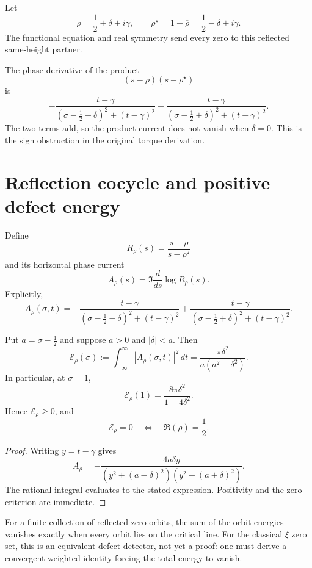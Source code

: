 Let
\[
  \rho=\frac12+\delta+i\gamma,
  \qquad
  \rho^\star=1-\overline\rho=\frac12-\delta+i\gamma.
\]
The functional equation and real symmetry send every zero to this reflected
same-height partner.

The phase derivative of the product
\[
  (s-\rho)(s-\rho^\star)
\]
is
\[
 -\frac{t-\gamma}{(\sigma-\frac12-\delta)^2+(t-\gamma)^2}
 -\frac{t-\gamma}{(\sigma-\frac12+\delta)^2+(t-\gamma)^2}.
\]
The two terms add, so the product current does not vanish when $\delta=0$.
This is the sign obstruction in the original torque derivation.

\section{Reflection cocycle and positive defect energy}

\begin{definition}
Define
\[
  R_\rho(s)=\frac{s-\rho}{s-\rho^\star}
\]
and its horizontal phase current
\[
  A_\rho(s)=\Im\frac{d}{ds}\log R_\rho(s).
\]
Explicitly,
\[
  A_\rho(\sigma,t)
  =-\frac{t-\gamma}{(\sigma-\frac12-\delta)^2+(t-\gamma)^2}
   +\frac{t-\gamma}{(\sigma-\frac12+\delta)^2+(t-\gamma)^2}.
\]
\end{definition}

\begin{theorem}
Put $a=\sigma-\tfrac12$ and suppose $a>0$ and $|\delta|<a$.  Then
\[
  \mathcal E_\rho(\sigma)
  :=\int_{-\infty}^{\infty}|A_\rho(\sigma,t)|^2\,dt
  =\frac{\pi\delta^2}{a(a^2-\delta^2)}.
\]
In particular, at $\sigma=1$,
\[
  \mathcal E_\rho(1)
  =\frac{8\pi\delta^2}{1-4\delta^2}.
\]
Hence $\mathcal E_\rho\ge0$, and
\[
  \mathcal E_\rho=0
  \quad\Longleftrightarrow\quad
  \Re(\rho)=\frac12.
\]
\end{theorem}

\begin{proof}
Writing $y=t-\gamma$ gives
\[
  A_\rho=-\frac{4a\delta y}
  {(y^2+(a-\delta)^2)(y^2+(a+\delta)^2)}.
\]
The rational integral evaluates to the stated expression.  Positivity and the
zero criterion are immediate.
\end{proof}

\begin{remark}[Status]
For a finite collection of reflected zero orbits, the sum of the orbit
energies vanishes exactly when every orbit lies on the critical line.  For the
classical $\xi$ zero set, this is an equivalent defect detector, not yet a
proof: one must derive a convergent weighted identity forcing the total energy
to vanish.
\end{remark}

